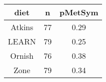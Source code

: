 \documentclass[]{book}
\theoremstyle{definition}
\theoremstyle{definition}
\theoremstyle{definition}
\theoremstyle{remark}
\begin{document}
\begin{longtable}[]{@{}ccc@{}}
\toprule
\begin{minipage}[b]{0.11\columnwidth}\centering\strut
diet\strut
\end{minipage} & \begin{minipage}[b]{0.06\columnwidth}\centering\strut
n\strut
\end{minipage} & \begin{minipage}[b]{0.11\columnwidth}\centering\strut
pMetSym\strut
\end{minipage}\tabularnewline
\midrule
\endhead
\begin{minipage}[t]{0.11\columnwidth}\centering\strut
Atkins\strut
\end{minipage} & \begin{minipage}[t]{0.06\columnwidth}\centering\strut
77\strut
\end{minipage} & \begin{minipage}[t]{0.11\columnwidth}\centering\strut
0.29\strut
\end{minipage}\tabularnewline
\begin{minipage}[t]{0.11\columnwidth}\centering\strut
LEARN\strut
\end{minipage} & \begin{minipage}[t]{0.06\columnwidth}\centering\strut
79\strut
\end{minipage} & \begin{minipage}[t]{0.11\columnwidth}\centering\strut
0.25\strut
\end{minipage}\tabularnewline
\begin{minipage}[t]{0.11\columnwidth}\centering\strut
Ornish\strut
\end{minipage} & \begin{minipage}[t]{0.06\columnwidth}\centering\strut
76\strut
\end{minipage} & \begin{minipage}[t]{0.11\columnwidth}\centering\strut
0.38\strut
\end{minipage}\tabularnewline
\begin{minipage}[t]{0.11\columnwidth}\centering\strut
Zone\strut
\end{minipage} & \begin{minipage}[t]{0.06\columnwidth}\centering\strut
79\strut
\end{minipage} & \begin{minipage}[t]{0.11\columnwidth}\centering\strut
0.34\strut
\end{minipage}\tabularnewline
\bottomrule
\end{longtable}
\end{document}
